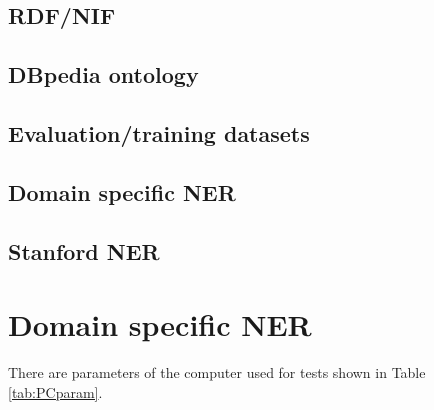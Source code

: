 \documentclass[thesis=M,english]{FITthesis}[2018/05/30]
\begin{document}
\section{RDF/NIF}

\section{DBpedia ontology}

\section{Evaluation/training datasets}

\section{Domain specific NER}

\section{Stanford NER}

\chapter{Domain specific NER}\label{}

There are parameters of the computer used for tests shown in Table \ref{tab:PCparam}.
\end{document}
